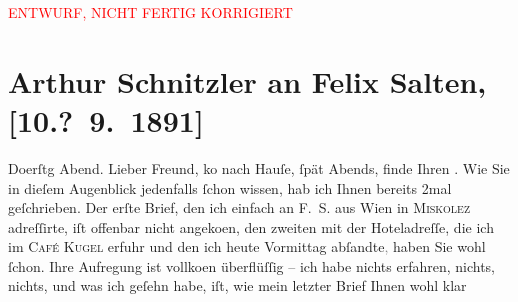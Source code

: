 
\begin{center}
            \textcolor{red}{ENTWURF, NICHT FERTIG KORRIGIERT}
                      \end{center}
            
         
         \renewcommand{\erwaehntePersonen}{Personen: Marie Glümer, Bertha Karlsburg, Felix Salten}
         \renewcommand{\erwaehnteOrte}{Orte: Café Kugel, Miskolc, Wien}
         \renewcommand{\erwaehnteWerke}{Werke: ?? [Drama über Offizier, der Partnerin eines Untergebenen verführt]}
               \section[Arthur Schnitzler an Felix Salten, {[}10.? 9. 1891{]}]{ Arthur Schnitzler an Felix Salten, {[}10.? 9. 1891{]}}\nopagebreak{}\rehead{ }\begin{ledgroupsized}[t]{13cm}\normalsize\beginnumbering{} \toendnotes[C]{\smallbreak\pagebreak[2]} 
\toendnotes[C]{\smallbreak}\pstart
           \raggedleft{}{\pb}Do{\geminationn}erſtg{ }Abend. \pend
           \pstart
           Lieber Freund, ko{\geminationm} nach
               Hauſe, ſpät Abends, finde Ihren \label{K_L02951-1v}\label{K_L02951-1h}. Wie Sie in dieſem Augenblick jedenfalls ſchon wissen, hab ich Ihnen bereits
               2mal geſchrieben. Der erſte {\pb}Brief, den ich
               einfach an \textsc{F. S.} aus Wien in \textsc{Miskolez} adreſſirte, iſt offenbar nicht angeko{\geminationm}en, den
               zweiten mit der Hoteladreſſe, die ich im \textsc{Café Kugel} erfuhr und den ich heute{ }Vormittag abſandte\textcolor{gray}{,} haben Sie wohl ſchon. Ihre
               Aufregung ist vollko{\geminationm}en {\pb}überflüſſig – ich habe nichts erfahren,
               nichts, nichts, und was ich geſehn habe, iſt, wie mein letzter Brief Ihnen wohl klar

\end{ledgroupsized}
